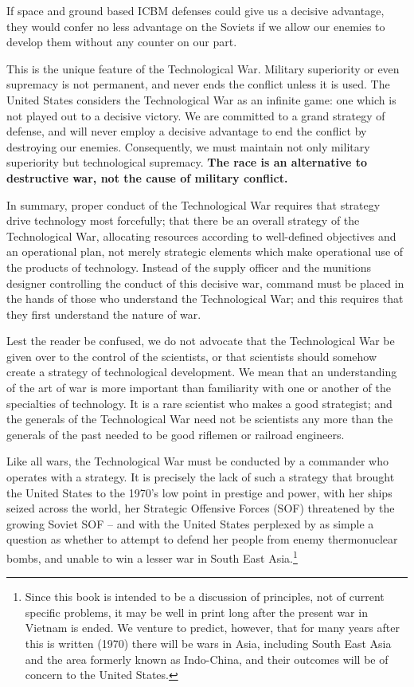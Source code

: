 If space and ground based ICBM defenses could give us a decisive advantage, they would confer no less advantage on the Soviets if we allow our enemies to develop them without any counter on our part.

This is the unique feature of the Technological War. Military superiority or even supremacy is not permanent, and never ends the conflict unless it is used. The United States considers the Technological War as an infinite game: one which is not played out to a decisive victory. We are committed to a grand strategy of defense, and will never employ a decisive advantage to end the conflict by destroying our enemies. Consequently, we must maintain not only military superiority but technological supremacy. \textbf{The race is an alternative to destructive war, not the cause of military conflict.}

In summary, proper conduct of the Technological War requires that strategy drive technology most forcefully; that there be an overall strategy of the Technological War, allocating resources according to well-defined objectives and an operational plan, not merely strategic elements which make operational use of the products of technology. Instead of the supply officer and the munitions designer controlling the conduct of this decisive war, command must be placed in the hands of those who understand the Technological War; and this requires that they first understand the nature of war.

Lest the reader be confused, we do not advocate that the Technological War be given over to the control of the scientists, or that scientists should somehow create a strategy of technological development. We mean that an understanding of the art of war is more important than familiarity with one or another of the specialties of technology. It is a rare scientist who makes a good strategist; and the generals of the Technological War need not be scientists any more than the generals of the past needed to be good riflemen or railroad engineers.

Like all wars, the Technological War must be conducted by a commander who operates with a strategy. It is precisely the lack of such a strategy that brought the United States to the 1970's low point in prestige and power, with her ships seized across the world, her Strategic Offensive Forces (SOF) threatened by the growing Soviet SOF -- and with the United States perplexed by as simple a question as whether to attempt to defend her people from enemy thermonuclear bombs, and unable to win a lesser war in South East Asia.\footnote{Since this book is intended to be a discussion of principles, not of current specific problems, it may be well in print long after the present war in Vietnam is ended. We venture to predict, however, that for many years after this is written (1970) there will be wars in Asia, including South East Asia and the area formerly known as Indo-China, and their outcomes will be of concern to the United States.}

